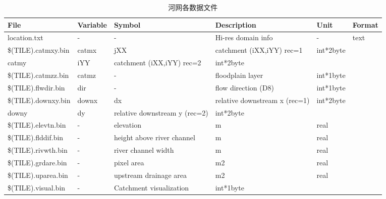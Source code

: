 \begin{table}[]
    \centering
    \caption{河网各数据文件}
    \label{tab:河网各数据文件}
    \begin{tabular}[h]{p{3.5cm}p{1.0cm}p{2.5cm}p{4cm}p{2cm}p{1cm}} %
    \toprule
    File                & Variable & Symbol                        & Description                   & Unit      & Format \\ \midrule
    location.txt        & -        & -                             & Hi-res domain info            & -         & text   \\
    \$(TILE).catmxy.bin & catmx    & jXX                           & catchment (iXX,iYY) rec=1     & int*2byte &        \\
    catmy               & iYY      & catchment (iXX,iYY) rec=2     & int*2byte                     &           &        \\
    \$(TILE).catmzz.bin & catmz    & -                             & floodplain layer              & int*1byte &        \\
    \$(TILE).flwdir.bin & dir      & -                             & flow direction (D8)           & int*1byte &        \\
    \$(TILE).downxy.bin & downx    & dx                            & relative downstream x (rec=1) & int*2byte &        \\
    downy               & dy       & relative downstream y (rec=2) & int*2byte                     &           &        \\
    \$(TILE).elevtn.bin & -        & elevation                     & m                             & real      &        \\
    \$(TILE).flddif.bin & -        & height above river channel    & m                             & real      &        \\
    \$(TILE).rivwth.bin & -        & river channel width           & m                             & real      &        \\
    \$(TILE).grdare.bin & -        & pixel area                    & m2                            & real      &        \\
    \$(TILE).uparea.bin & -        & upstream drainage area        & m2                            & real      &        \\
    \$(TILE).visual.bin & -        & Catchment visualization       & int*1byte                     &           &        \\ \bottomrule
    \end{tabular}
    \end{table}


